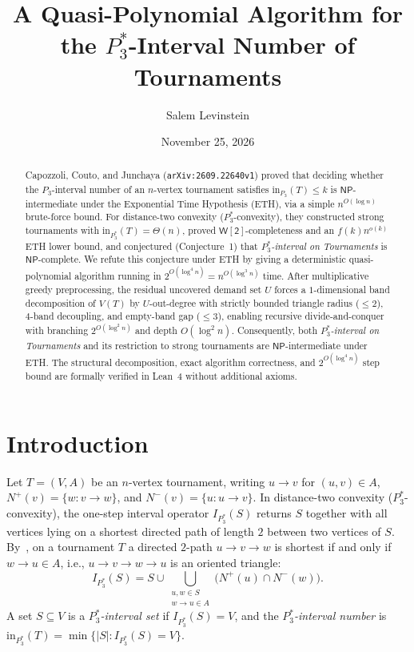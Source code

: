 \documentclass[11pt]{article}
\title{A Quasi-Polynomial Algorithm for the $P_3^*$-Interval Number of Tournaments}
\author{Salem Levinstein}
\date{November 25, 2026}
\theoremstyle{remark}
\begin{document}
\maketitle

\begin{abstract}
Capozzoli, Couto, and Junchaya (\texttt{arXiv:2609.22640v1}) proved that deciding whether the $P_3$-interval number of an $n$-vertex tournament satisfies $\mathrm{in}_{P_3}(T) \le k$ is $\mathsf{NP}$-intermediate under the Exponential Time Hypothesis (ETH), via a simple $n^{O(\log n)}$ brute-force bound. For distance-two convexity ($P_3^*$-convexity), they constructed strong tournaments with $\mathrm{in}_{P_3^*}(T) = \Theta(n)$, proved $\mathsf{W[2]}$-completeness and an $f(k)n^{o(k)}$ ETH lower bound, and conjectured (Conjecture~1) that \emph{$P_3^*$-interval on Tournaments} is $\mathsf{NP}$-complete. We refute this conjecture under ETH by giving a deterministic quasi-polynomial algorithm running in $2^{O(\log^4 n)} = n^{O(\log^3 n)}$ time. After multiplicative greedy preprocessing, the residual uncovered demand set $U$ forces a $1$-dimensional band decomposition of $V(T)$ by $U$-out-degree with strictly bounded triangle radius ($\le 2$), $4$-band decoupling, and empty-band gap ($\le 3$), enabling recursive divide-and-conquer with branching $2^{O(\log^2 n)}$ and depth $O(\log^2 n)$. Consequently, both \emph{$P_3^*$-interval on Tournaments} and its restriction to strong tournaments are $\mathsf{NP}$-intermediate under ETH. The structural decomposition, exact algorithm correctness, and $2^{O(\log^4 n)}$ step bound are formally verified in Lean~4 without additional axioms.
\end{abstract}

\section{Introduction}

Let $T = (V, A)$ be an $n$-vertex tournament, writing $u \to v$ for $(u, v) \in A$, $N^+(v) = \{w : v \to w\}$, and $N^-(v) = \{u : u \to v\}$. In distance-two convexity ($P_3^*$-convexity), the one-step interval operator $I_{P_3^*}(S)$ returns $S$ together with all vertices lying on a shortest directed path of length $2$ between two vertices of $S$. By~\cite[Lemma~4]{CCJ2026}, on a tournament $T$ a directed $2$-path $u \to v \to w$ is shortest if and only if $w \to u \in A$, i.e., $u \to v \to w \to u$ is an oriented triangle:
\[
  I_{P_3^*}(S) = S \cup \bigcup_{\substack{u, w \in S \\ w \to u \in A}} \bigl(N^+(u) \cap N^-(w)\bigr).
\]
A set $S \subseteq V$ is a \emph{$P_3^*$-interval set} if $I_{P_3^*}(S) = V$, and the \emph{$P_3^*$-interval number} is $\mathrm{in}_{P_3^*}(T) = \min\{|S| : I_{P_3^*}(S) = V\}$.
\end{document}

